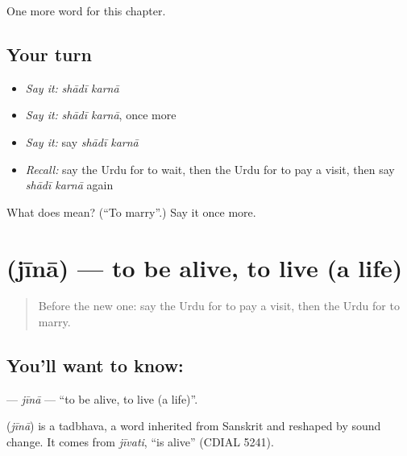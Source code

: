 \begin{grammarlens}[title={What you've built}]
One more word for this chapter.
\end{grammarlens}

\subsection*{Your turn}
\begin{itemize}
\raggedright
  \item \emph{Say it:} \emph{shādī karnā}
  \item \emph{Say it:} \emph{shādī karnā}, once more
  \item \emph{Say it:} say \emph{shādī karnā}
  \item \emph{Recall:} say the Urdu for to wait, then the Urdu for to pay a visit, then say \emph{shādī karnā} again
\end{itemize}

\begin{tcolorbox}[breakable,colback=teal!4,colframe=teal!35!black,title={Before you move on}]
What does   mean? (\textquotedblleft{}To marry\textquotedblright{}.) Say it once more.
\end{tcolorbox}
\section[\texorpdfstring{\ur{جینا} (jīnā)}{جینا (jīnā)}]{ (jīnā) — to be alive, to live (a life)}

\label{lesson:UR-C183-jina}



\begin{quote}
Before the new one: say the Urdu for to pay a visit, then the Urdu for to marry.
\end{quote}

\subsection*{You'll want to know: }
\textbf{} — \emph{jīnā} — \textquotedblleft{}to be alive, to live (a life)\textquotedblright{}.

\begin{cousinweb}
\textbf{} (\emph{jīnā}) is a tadbhava, a word inherited from Sanskrit and reshaped by sound change. It comes from \emph{jīvati}, \textquotedblleft{}is alive\textquotedblright{} (CDIAL 5241).
\end{cousinweb}

